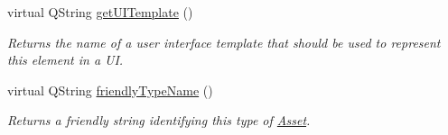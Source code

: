 \begin{DoxyCompactItemize}
\item 
\hypertarget{class_picto_1_1_analysis_data_source_dep_ae2ea32d6e96947e7e9d13faad7156d4b}{virtual Q\-String \hyperlink{class_picto_1_1_analysis_data_source_dep_ae2ea32d6e96947e7e9d13faad7156d4b}{get\-U\-I\-Template} ()}\label{class_picto_1_1_analysis_data_source_dep_ae2ea32d6e96947e7e9d13faad7156d4b}

\begin{DoxyCompactList}\small\item\em Returns the name of a user interface template that should be used to represent this element in a U\-I. \end{DoxyCompactList}\item 
virtual Q\-String \hyperlink{class_picto_1_1_analysis_data_source_dep_ae9bc7a224836bd87f396209d91fb897a}{friendly\-Type\-Name} ()
\begin{DoxyCompactList}\small\item\em Returns a friendly string identifying this type of \hyperlink{class_picto_1_1_asset}{Asset}. \end{DoxyCompactList}\end{DoxyCompactItemize}
